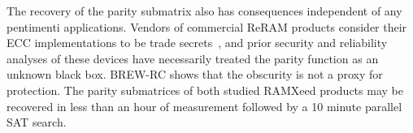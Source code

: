 The recovery of the parity submatrix also has consequences independent
of any pentimenti applications. Vendors of commercial ReRAM products
consider their ECC implementations to be trade
secrets~\cite{patel2020bit}, and prior security and reliability analyses
of these devices have necessarily treated the parity function as an
unknown black box. BREW-RC shows that the obscurity is not a proxy for
protection. The parity submatrices of both studied RAMXeed products may
be recovered in less than an hour of measurement followed by a 10 minute
parallel SAT search.
